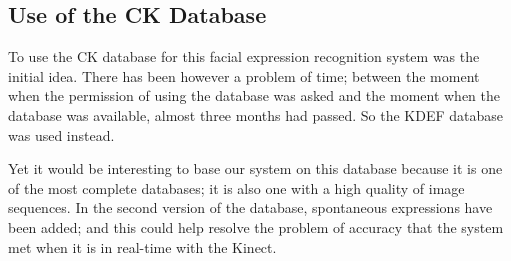 \subsection{Use of the CK Database}

\vspace{\baselineskip}
\noindent To use the CK database for this facial expression recognition system was the initial idea. There has been however a problem of time; between the moment when the permission of using the database was asked and the moment when the database was available, almost three months had passed. So the KDEF database was used instead. 
\newline

\noindent Yet it would be interesting to base our system on this database because it is one of the most complete databases; it is also one with a high quality of image sequences. In the second version of the database, spontaneous expressions have been added; and this could help resolve the problem of accuracy that the system met when it is in real-time with the Kinect.
\newline

